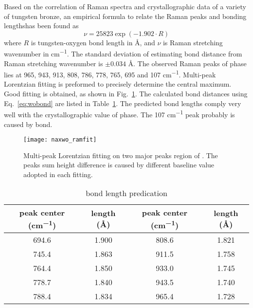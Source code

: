 Based on the correlation of Raman spectra and crystallographic data of a variety of tungsten bronze, an empirical formula to relate the Raman peaks and  bonding lengthshas been found as 
\begin{equation}\label{eq:wobond}
\nu = 25823 \exp(-1.902\cdot R)
\end{equation}
where $R$ is tungsten-oxygen bond length in \AA, and $\nu$ is Raman stretching wavenumber in \si{cm^{-1}}.\cite{Hardcastle1995} The standard deviation of estimating  bond distance from Raman stretching wavenumber is $\pm0.034$ \AA. The observed Raman peaks of  phase lies at 965, 943, 913, 808, 786, 778, 765, 695 and 107 \si{cm^{-1}}. Multi-peak Lorentzian fitting is preformed to precisely determine the central maximum. Good fitting is obtained, as shown in Fig.~\ref{fig:naworamfit}. The calculated  bond distances using Eq.~\ref{eq:wobond} are listed in Table~\ref{tab:nawobond}. The predicted  bond lengths comply very well with the crystallographic value of  phase.\cite{Triantafyllou1999a} The 107 \si{cm^{-1}} peak probably is caused by  bond.
\begin{figure}[htb]
\centering
\texttt{[image: naxwo\_ramfit]}
\caption[ Raman fitting]{Multi-peak Lorentzian fitting on two major peaks region of . The peaks sum height difference is caused by different baseline value adopted in each fitting.}
\label{fig:naworamfit}
\end{figure}

\begin{table}[htb]
\centering
\caption{ bond length predication}\label{tab:nawobond}
\begin{tabular}{cccc}
\toprule
peak center (\si{cm^{-1}}) & length (\AA) & peak center (\si{cm^{-1}}) & length (\AA) \\
\midrule
694.6 & 1.900 &  808.6 &  1.821 \\
745.4 & 1.863 &  911.5 &  1.758 \\
764.4 & 1.850 &  933.0 &  1.745 \\
778.7 & 1.840 &   943.5 & 1.740 \\
788.4 & 1.834 &   965.4 & 1.728 \\
\bottomrule
\end{tabular}
\end{table}


